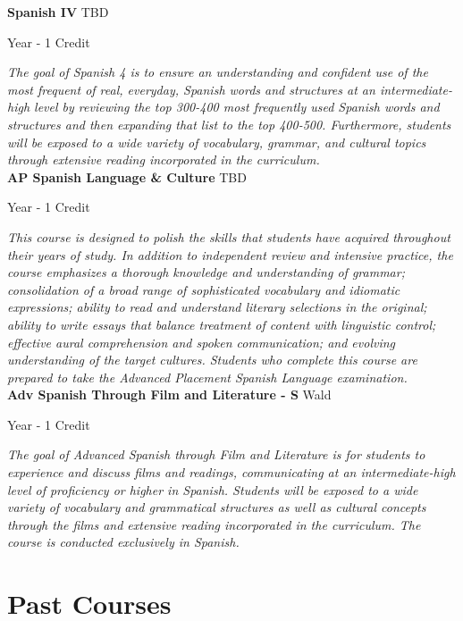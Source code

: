 \noindent\textbf{Spanish IV} \hfill TBD

\noindent Year - 1 Credit

\vspace{1mm}\emph{The goal of Spanish 4 is to ensure an understanding and confident use of the most frequent of real, everyday, Spanish words and structures at an intermediate-high level by reviewing the top 300-400 most frequently used Spanish words and structures and then expanding that list to the top 400-500.  Furthermore, students will be exposed to a wide variety of vocabulary, grammar, and cultural topics through extensive reading incorporated in the curriculum.}\\


\noindent\textbf{AP Spanish Language \& Culture} \hfill TBD

\noindent Year - 1 Credit

\vspace{1mm}\emph{This course is designed to polish the skills that students have acquired throughout their years of study. In addition to independent review and intensive practice, the course emphasizes a thorough knowledge and understanding of grammar; consolidation of a broad range of sophisticated vocabulary and idiomatic expressions; ability to read and understand literary selections in the original; ability to write essays that balance treatment of content with linguistic control; effective aural comprehension and spoken communication; and evolving understanding of the target cultures. Students who complete this course are prepared to take the Advanced Placement Spanish Language examination.}\\


\noindent\textbf{Adv Spanish Through Film and Literature - S} \hfill Wald

\noindent Year - 1 Credit

\vspace{1mm}\emph{The goal of Advanced Spanish through Film and Literature is for students to experience and discuss films and readings, communicating at an intermediate-high level of proficiency or higher in Spanish.  Students will be exposed to a wide variety of vocabulary and grammatical structures as well as cultural concepts through the films and extensive reading incorporated in the curriculum.  The course is conducted exclusively in Spanish. }\\


\section{Past Courses}

